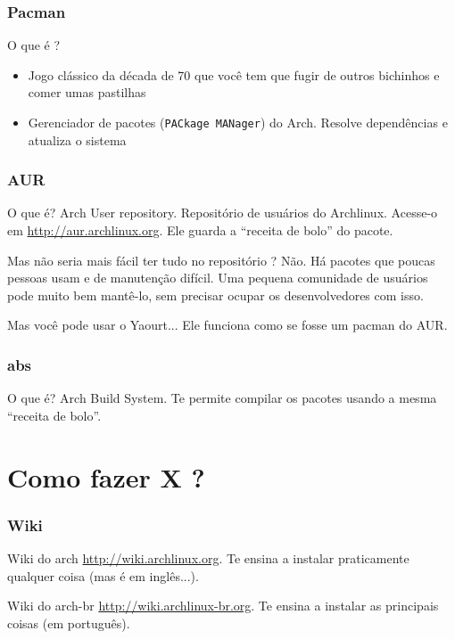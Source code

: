 \documentclass{beamer}
\begin{document}
\begin{frame}[fragile]
        \frametitle{Pacman}
        \begin{block}{O que é ?}
                \begin{itemize}
                    \item Jogo clássico da década de 70 que você tem que fugir de outros bichinhos e comer umas pastilhas
                    \item Gerenciador de pacotes (\verb#PACkage MANager#) do Arch. Resolve dependências e atualiza o sistema
            \end{itemize}
        \end{block}
\end{frame}

\begin{frame}
    \frametitle{AUR}
    \begin{block}{O que é?}
            Arch User repository. Repositório de usuários do Archlinux. Acesse-o em \url{http://aur.archlinux.org}. Ele guarda a ``receita de bolo'' do pacote.
    \end{block}
    \begin{block}{Mas não seria mais fácil ter tudo no repositório ?}
            Não. Há pacotes que poucas pessoas usam e de manutenção difícil. Uma pequena comunidade de usuários
            pode muito bem mantê-lo, sem precisar ocupar os desenvolvedores com isso.
    \end{block}
    \begin{block}{Mas você pode usar o Yaourt...}
        Ele funciona como se fosse um pacman do AUR. 
    \end{block}
\end{frame}

\begin{frame}
    \frametitle{abs}
    \begin{block}{O que é?}
            Arch Build System. Te permite compilar os pacotes usando a mesma ``receita de bolo''.
    \end{block}

\end{frame}

\section{Como fazer X ? }

\begin{frame}
    \frametitle{Wiki}
    \begin{block}{Wiki do arch}
        \url{http://wiki.archlinux.org}. Te ensina a instalar praticamente qualquer coisa (mas é em inglês...).
    \end{block}        

    \begin{block}{Wiki do arch-br}
        \url{http://wiki.archlinux-br.org}. Te ensina a instalar as principais coisas (em português). 
    \end{block}        
\end{frame}
\end{document}
